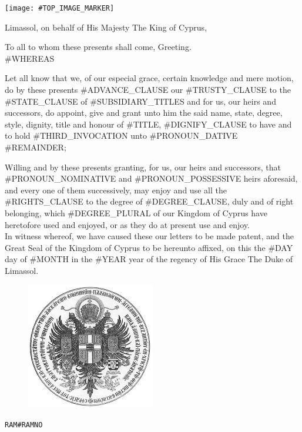 \documentclass[varwidth=true,border=50pt]{standalone}
\begin{document}
\thispagestyle{fancy}

\noindent \texttt{[image: \#TOP\_IMAGE\_MARKER]}

{\LARGE
Limassol, on behalf of His Majesty The King of Cyprus,

\hspace{20pt} To all to whom these presents shall come, Greeting.\\

#WHEREAS

\hspace{20pt} Let all know that we, of our especial grace, certain knowledge and mere motion, do by these presents #ADVANCE_CLAUSE our #TRUSTY_CLAUSE \hspace{7pt}{\hoskeroe #GRANTEE}\hspace{7pt} to the #STATE_CLAUSE of \hspace{7pt}{\hoskeroe #TITLE}\hspace{7pt} #SUBSIDIARY_TITLES and for us, our heirs and successors, do appoint, give and grant unto him the said name, state, degree, style, dignity, title and honour of #TITLE, #DIGNIFY_CLAUSE to have and to hold #THIRD_INVOCATION unto #PRONOUN_DATIVE #REMAINDER;

\hspace{20pt} Willing and by these presents granting, for us, our heirs and successors, that #PRONOUN_NOMINATIVE and #PRONOUN_POSSESSIVE heirs aforesaid, and every one of them successively, may enjoy and use all the #RIGHTS_CLAUSE to the degree of #DEGREE_CLAUSE, duly and of right belonging, which #DEGREE_PLURAL of our Kingdom of Cyprus have heretofore used and enjoyed, or as they do at present use and enjoy.\\

\hspace{20pt} In witness whereof, we have caused these our letters to be made patent, and the Great Seal of the Kingdom of Cyprus to be hereunto affixed, on this the #DAY day of #MONTH in the #YEAR year of the regency of His Grace The Duke of Limassol.
}

\begin{figure}[h]
\centering
\includegraphics[width=0.5\textwidth]{seal}
\end{figure}

\hfill {\footnotesize \texttt{RAM{#RAMNO}}}
\end{document}
